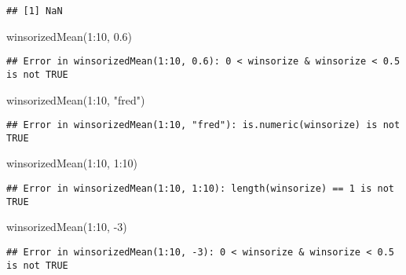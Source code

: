 \documentclass[
]{article}
\newenvironment{Shaded}{\begin{snugshade}}{\end{snugshade}}
\newcommand{\DecValTok}[1]{\textcolor[rgb]{0.00,0.00,0.81}{#1}}
\newcommand{\FloatTok}[1]{\textcolor[rgb]{0.00,0.00,0.81}{#1}}
\newcommand{\FunctionTok}[1]{\textcolor[rgb]{0.00,0.00,0.00}{#1}}
\newcommand{\NormalTok}[1]{#1}
\newcommand{\SpecialCharTok}[1]{\textcolor[rgb]{0.00,0.00,0.00}{#1}}
\newcommand{\StringTok}[1]{\textcolor[rgb]{0.31,0.60,0.02}{#1}}
\begin{document}
\begin{verbatim}
## [1] NaN
\end{verbatim}

\begin{Shaded}
\begin{Highlighting}[]
\FunctionTok{winsorizedMean}\NormalTok{(}\DecValTok{1}\SpecialCharTok{:}\DecValTok{10}\NormalTok{, }\FloatTok{0.6}\NormalTok{)}
\end{Highlighting}
\end{Shaded}

\begin{verbatim}
## Error in winsorizedMean(1:10, 0.6): 0 < winsorize & winsorize < 0.5 is not TRUE
\end{verbatim}

\begin{Shaded}
\begin{Highlighting}[]
\FunctionTok{winsorizedMean}\NormalTok{(}\DecValTok{1}\SpecialCharTok{:}\DecValTok{10}\NormalTok{, }\StringTok{"fred"}\NormalTok{)}
\end{Highlighting}
\end{Shaded}

\begin{verbatim}
## Error in winsorizedMean(1:10, "fred"): is.numeric(winsorize) is not TRUE
\end{verbatim}

\begin{Shaded}
\begin{Highlighting}[]
\FunctionTok{winsorizedMean}\NormalTok{(}\DecValTok{1}\SpecialCharTok{:}\DecValTok{10}\NormalTok{, }\DecValTok{1}\SpecialCharTok{:}\DecValTok{10}\NormalTok{)}
\end{Highlighting}
\end{Shaded}

\begin{verbatim}
## Error in winsorizedMean(1:10, 1:10): length(winsorize) == 1 is not TRUE
\end{verbatim}

\begin{Shaded}
\begin{Highlighting}[]
\FunctionTok{winsorizedMean}\NormalTok{(}\DecValTok{1}\SpecialCharTok{:}\DecValTok{10}\NormalTok{, }\SpecialCharTok{{-}}\DecValTok{3}\NormalTok{)}
\end{Highlighting}
\end{Shaded}

\begin{verbatim}
## Error in winsorizedMean(1:10, -3): 0 < winsorize & winsorize < 0.5 is not TRUE
\end{verbatim}
\end{document}
